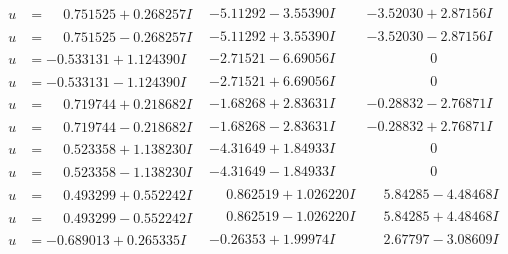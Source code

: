 \documentclass[1p]{elsarticle_modified}
\theoremstyle{definition}
\begin{document}
$$\begin{array}{c|c|c}
\begin{aligned}
u &= \phantom{-}0.751525 + 0.268257 I\end{aligned}
 & -5.11292 - 3.55390 I & -3.52030 + 2.87156 I \\ \hline\begin{aligned}
u &= \phantom{-}0.751525 - 0.268257 I\end{aligned}
 & -5.11292 + 3.55390 I & -3.52030 - 2.87156 I \\ \hline\begin{aligned}
u &= -0.533131 + 1.124390 I\end{aligned}
 & -2.71521 - 6.69056 I & \phantom{-0.000000 } 0 \\ \hline\begin{aligned}
u &= -0.533131 - 1.124390 I\end{aligned}
 & -2.71521 + 6.69056 I & \phantom{-0.000000 } 0 \\ \hline\begin{aligned}
u &= \phantom{-}0.719744 + 0.218682 I\end{aligned}
 & -1.68268 + 2.83631 I & -0.28832 - 2.76871 I \\ \hline\begin{aligned}
u &= \phantom{-}0.719744 - 0.218682 I\end{aligned}
 & -1.68268 - 2.83631 I & -0.28832 + 2.76871 I \\ \hline\begin{aligned}
u &= \phantom{-}0.523358 + 1.138230 I\end{aligned}
 & -4.31649 + 1.84933 I & \phantom{-0.000000 } 0 \\ \hline\begin{aligned}
u &= \phantom{-}0.523358 - 1.138230 I\end{aligned}
 & -4.31649 - 1.84933 I & \phantom{-0.000000 } 0 \\ \hline\begin{aligned}
u &= \phantom{-}0.493299 + 0.552242 I\end{aligned}
 & \phantom{-}0.862519 + 1.026220 I & \phantom{-}5.84285 - 4.48468 I \\ \hline\begin{aligned}
u &= \phantom{-}0.493299 - 0.552242 I\end{aligned}
 & \phantom{-}0.862519 - 1.026220 I & \phantom{-}5.84285 + 4.48468 I \\ \hline\begin{aligned}
u &= -0.689013 + 0.265335 I\end{aligned}
 & -0.26353 + 1.99974 I & \phantom{-}2.67797 - 3.08609 I \\ \hline\begin{aligned}

\end{aligned}
\end{array}$$
\end{document}
